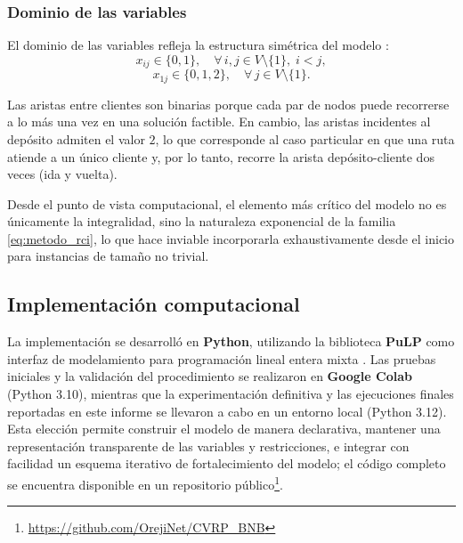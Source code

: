 \subsubsection{Dominio de las variables}

El dominio de las variables refleja la estructura simétrica del modelo
\parencite{laporte1983branch}:
\begin{equation}
    x_{ij} \in \{0, 1\}, \quad \forall\, i, j \in V \setminus \{1\},\; i < j,
    \label{eq:metodo_dominio_clientes}
\end{equation}
\begin{equation}
    x_{1j} \in \{0, 1, 2\}, \quad \forall\, j \in V \setminus \{1\}.
    \label{eq:metodo_dominio_deposito}
\end{equation}

Las aristas entre clientes son binarias porque cada par de nodos puede recorrerse a lo
más una vez en una solución factible. En cambio, las aristas incidentes al depósito
admiten el valor $2$, lo que corresponde al caso particular en que una ruta atiende a
un único cliente y, por lo tanto, recorre la arista depósito-cliente dos veces (ida y
vuelta).

Desde el punto de vista computacional, el elemento más crítico del modelo no es
únicamente la integralidad, sino la naturaleza exponencial de la familia
\eqref{eq:metodo_rci}, lo que hace inviable incorporarla exhaustivamente desde el
inicio para instancias de tamaño no trivial.

\subsection{Implementación computacional}

La implementación se desarrolló en \textbf{Python}, utilizando la biblioteca
\textbf{PuLP} como interfaz de modelamiento para programación lineal entera
mixta \parencite{pulp2011}. Las pruebas iniciales y la validación del
procedimiento se realizaron en \textbf{Google Colab} (Python 3.10), mientras
que la experimentación definitiva y las ejecuciones finales reportadas en este
informe se llevaron a cabo en un entorno local (Python 3.12). Esta elección
permite construir el modelo de manera declarativa, mantener una representación
transparente de las variables y restricciones, e integrar con facilidad un
esquema iterativo de fortalecimiento del modelo; el código completo se encuentra disponible en un
repositorio público\footnote{\url{https://github.com/OrejiNet/CVRP_BNB}}.

